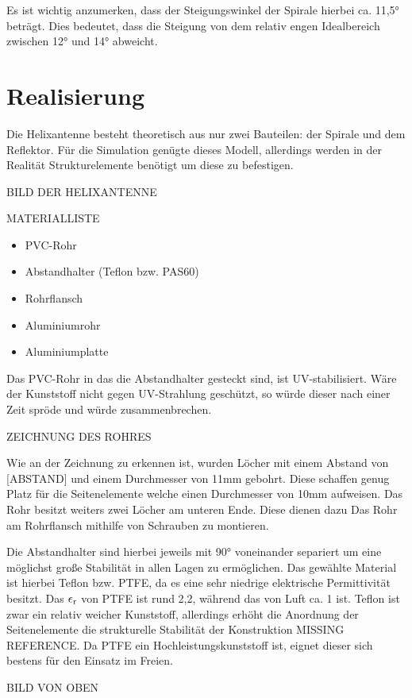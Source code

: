 Es ist wichtig anzumerken, dass der Steigungswinkel der Spirale hierbei ca. 11,5° beträgt. Dies bedeutet, dass die Steigung von dem relativ engen Idealbereich zwischen 12° und 14° abweicht.

\section{Realisierung}
Die Helixantenne besteht theoretisch aus nur zwei Bauteilen: der Spirale und dem Reflektor. Für die Simulation genügte dieses Modell, allerdings werden in der Realität Strukturelemente benötigt um diese zu befestigen.

BILD DER HELIXANTENNE

MATERIALLISTE
\begin{itemize}
	\item PVC-Rohr
	\item Abstandhalter (Teflon bzw. PAS60)
	\item Rohrflansch
	\item Aluminiumrohr
	\item Aluminiumplatte
\end{itemize}

Das PVC-Rohr in das die Abstandhalter gesteckt sind, ist UV-stabilisiert. Wäre der Kunststoff nicht gegen UV-Strahlung geschützt, so würde dieser nach einer Zeit spröde und würde zusammenbrechen.

ZEICHNUNG DES ROHRES

Wie an der Zeichnung zu erkennen ist, wurden Löcher mit einem Abstand von [ABSTAND] und einem Durchmesser von 11mm gebohrt. Diese schaffen genug Platz für die Seitenelemente welche einen Durchmesser von 10mm aufweisen. Das Rohr besitzt weiters zwei Löcher am unteren Ende. Diese dienen dazu Das Rohr am Rohrflansch mithilfe von Schrauben zu montieren. 

Die Abstandhalter sind hierbei jeweils mit 90° voneinander separiert um eine möglichst große Stabilität in allen Lagen zu ermöglichen. Das gewählte Material ist hierbei Teflon bzw. PTFE, da es eine sehr niedrige elektrische Permittivität besitzt. Das $\epsilon\textsubscript{r}$ von PTFE ist rund 2,2, während das von Luft ca. 1 ist. Teflon ist zwar ein relativ weicher Kunststoff, allerdings erhöht die Anordnung der Seitenelemente die strukturelle Stabilität der Konstruktion MISSING REFERENCE. Da PTFE ein Hochleistungskunststoff ist, eignet dieser sich bestens für den Einsatz im Freien.

BILD VON OBEN

